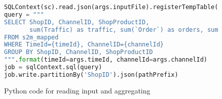 
\begin{figure}[h]
\caption{Python code for reading input and aggregating }
\begin{lstlisting}[language=python]
SQLContext(sc).read.json(args.inputFile).registerTempTable("s2m_mapped")
query = """
SELECT ShopID, ChannelID, ShopProductID,
       sum(Traffic) as traffic, sum(`Order`) as orders, sum(Cost) as costs
FROM s2m_mapped
WHERE TimeId={timeId}, ChannelID={channelId}
GROUP BY ShopID, ChannelID, ShopProductID
""".format(timeId=args.timeId, channelId=args.channelId)
job = sqlContext.sql(query)
job.write.partitionBy('ShopID').json(pathPrefix)
\end{lstlisting}
\end{figure}
